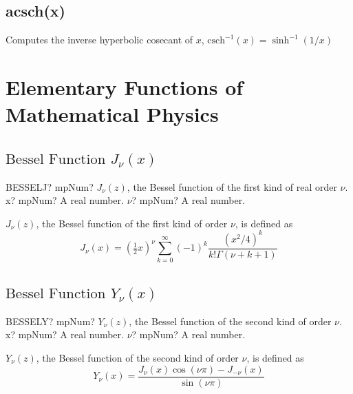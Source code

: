 \subsection{acsch(x)}
Computes the inverse hyperbolic cosecant of $x$, $\text{csch}^{-1}(x) = \sinh^{-1}(1/x)$




\newpage
\section{Elementary Functions of Mathematical Physics}

\subsection{\texorpdfstring{$\text{Bessel Function }J_{\nu}(x)$}{Bessel Function Jnu}}

\label{BESSELJnu} 
\begin{mpFunctionsExtract}
	\mpWorksheetFunctionTwoNotImplemented
	{BESSELJ? mpNum? $J_{\nu}(z)$, the Bessel function of the first kind of real order $\nu$.}
	{x? mpNum? A real number.}
	{$\nu$? mpNum? A real number.}
\end{mpFunctionsExtract}

\vspace{0.3cm}
$J_{\nu}(z)$, the Bessel function of the first kind of order $\nu$, is defined as
\begin{equation}
	J_{\nu}(x)  = \left(\tfrac{1}{2}x\right)^{\nu}  \sum_{k=0}^\infty (-1)^k \frac{(x^2 / 4)^k}{k! \Gamma(\nu+k+1)}
\end{equation}




\subsection{\texorpdfstring{$\text{Bessel Function }Y_{\nu}(x)$}{Ynux}}
\label{BESSELYnu} 

\begin{mpFunctionsExtract}
	\mpWorksheetFunctionTwoNotImplemented
	{BESSELY? mpNum? $Y_{\nu}(z)$, the Bessel function of the second kind of order $\nu$.}
	{x? mpNum? A real number.}
	{$\nu$? mpNum? A real number.}
\end{mpFunctionsExtract}

\vspace{0.3cm}
$Y_{\nu}(z)$, the Bessel function of the second kind of order $\nu$, is defined as
\begin{equation}
	Y_{\nu}(x)  = \frac{J_{\nu}(x) \cos(\nu \pi) - J_{-\nu}(x)}{ \sin(\nu \pi)}
\end{equation}



